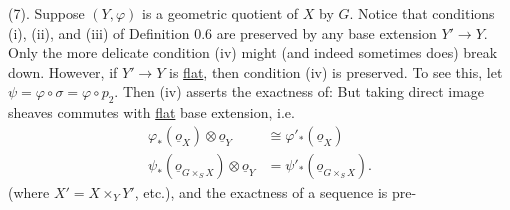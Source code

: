 (7). Suppose $(Y,\varphi)$ is a geometric quotient of $X$ by $G$. Notice that conditions (i), (ii), and (iii) of Definition 0.6 are preserved by any base extension $Y'\to Y$. Only the more delicate condition (iv) might (and indeed sometimes does) break down. However, if $Y'\longrightarrow Y$ is \uline{flat}, then condition (iv) is preserved. To see this, let $\psi=\varphi\circ\sigma=\varphi\circ p_2$. Then (iv) asserts the exactness of:
But taking direct image sheaves commutes with \uline{flat} base extension, i.e.
\[
\begin{aligned}
\varphi_*(\underline o_X)\otimes\underline o_Y&\cong\varphi'_*(\underline o_X)\\
\psi_*(\underline o_{G\times_S X})\otimes\underline o_Y&=\psi'_*(\underline o_{G\times_S X}).
\end{aligned}
\]
(where $X'=X\times_Y Y'$, etc.), and the exactness of a sequence is pre-


